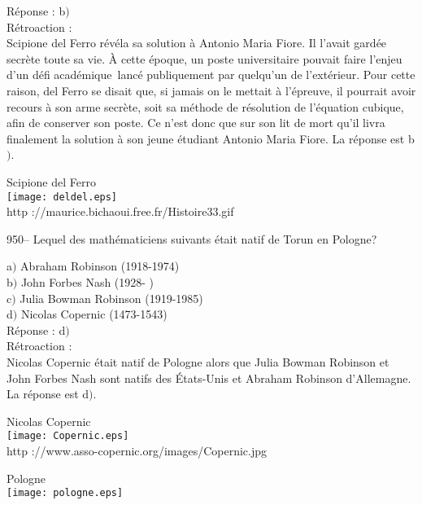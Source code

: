 ﻿\documentclass[letterpaper, 12pt]{article}
\begin{document}
R\'eponse : b$)$\\

R\'etroaction : \\
Scipione del Ferro r\'ev\'ela sa solution \`a Antonio Maria Fiore.
Il l'avait gard\'ee secr\`ete toute sa vie. \`A cette \'epoque, un
poste universitaire pouvait faire l'enjeu d'un \og d\'efi
acad\'emique\fg\ lanc\'e publiquement par quelqu'un de
l'ext\'erieur. Pour cette raison, del Ferro se disait que, si jamais
on le mettait \`a l'\'epreuve, il pourrait avoir recours \`a son
arme secr\`ete, soit sa m\'ethode de r\'esolution de l'\'equation
cubique, afin de conserver son poste. Ce n'est donc que sur son lit
de mort qu'il livra finalement la solution \`a son jeune
\'etudiant Antonio Maria Fiore. La r\'eponse est b$)$.\\

        \begin{center}
        Scipione del Ferro\\
    \texttt{[image: deldel.eps]}\\
        {\footnotesize http ://maurice.bichaoui.free.fr/Histoire33.gif}
    \end{center}

950-- Lequel des math\'ematiciens suivants \'etait natif de Torun en
Pologne?

a$)$ Abraham Robinson (1918-1974) \\
b$)$ John Forbes Nash (1928- ) \\
c$)$ Julia Bowman Robinson (1919-1985) \\
d$)$ Nicolas Copernic (1473-1543) \\

R\'eponse : d$)$\\

R\'etroaction : \\
Nicolas Copernic \'etait natif de Pologne alors que Julia Bowman
Robinson et John Forbes Nash sont natifs des \'Etats-Unis
et Abraham Robinson d'Allemagne. La r\'eponse est d$)$.\\

        \begin{center}
        Nicolas Copernic\\
    \texttt{[image: Copernic.eps]}\\
        {\footnotesize http ://www.asso-copernic.org/images/Copernic.jpg}
    \end{center}

        \begin{center}
        Pologne\\
    \texttt{[image: pologne.eps]}\\
    \end{center}
\end{document}
